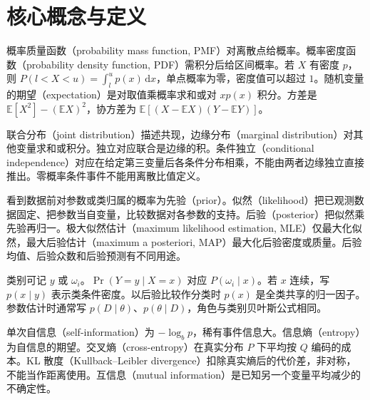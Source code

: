 \documentclass[UTF8,a4paper,zihao=-4,fontset=fandol]{ctexrep}
\begin{document}
\section{核心概念与定义}
\begin{description}[leftmargin=2em,style=nextline]
\item[概率表示] 概率质量函数（probability mass function, PMF）对离散点给概率。概率密度函数（probability density function, PDF）需积分后给区间概率。若 \(X\) 有密度 \(p\)，则 \(P(l<X<u)=\int_l^u p(x)\,\mathrm dx\)，单点概率为零，密度值可以超过 \(1\)。随机变量的期望（expectation）是对取值乘概率求和或对 \(xp(x)\) 积分。方差是 \(\mathbb E[X^2]-(\mathbb E X)^2\)，协方差为 \(\mathbb E[(X-\mathbb EX)(Y-\mathbb EY)]\)。
\item[条件与边缘] 联合分布（joint distribution）描述共现，边缘分布（marginal distribution）对其他变量求和或积分。独立对应联合是边缘的积。条件独立（conditional independence）对应在给定第三变量后各条件分布相乘，不能由两者边缘独立直接推出。零概率条件事件不能用离散比值定义。
\item[先验和参数估计] 看到数据前对参数或类归属的概率为先验（prior）。似然（likelihood）把已观测数据固定、把参数当自变量，比较数据对各参数的支持。后验（posterior）把似然乘先验再归一。极大似然估计（maximum likelihood estimation, MLE）仅最大化似然，最大后验估计（maximum a posteriori, MAP）最大化后验密度或质量。后验均值、后验众数和后验预测有不同用途。
\item[两种老师的记法] 类别可记 \(y\) 或 \(\omega_i\)。\(\Pr(Y=y\mid X=x)\) 对应 \(P(\omega_i\mid x)\)。若 \(x\) 连续，写 \(p(x\mid y)\) 表示类条件密度。以后验比较作分类时 \(p(x)\) 是全类共享的归一因子。参数估计时通常写 \(p(D\mid\theta)\)、\(p(\theta\mid D)\)，角色与类别贝叶斯公式相同。
\item[信息量] 单次自信息（self-information）为 \(-\log_b p\)，稀有事件信息大。信息熵（entropy）为自信息的期望。交叉熵（cross-entropy）在真实分布 \(P\) 下平均按 \(Q\) 编码的成本。KL 散度（Kullback--Leibler divergence）扣除真实熵后的代价差，非对称，不能当作距离使用。互信息（mutual information）是已知另一个变量平均减少的不确定性。
\end{description}
\end{document}
